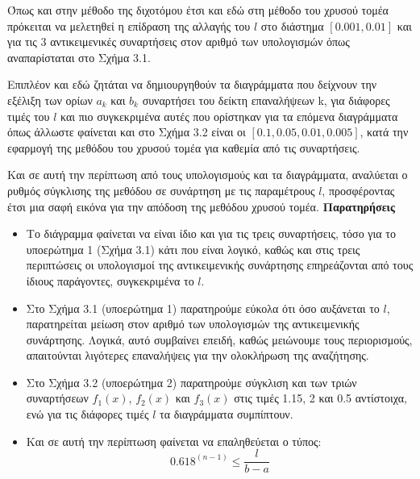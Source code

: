 \documentclass[a4paper,12pt]{report}
\newcommand{\en}{\selectlanguage{english}}
\newcommand{\gr}{\selectlanguage{greek}}
\begin{document}
\vspace{0.3cm}

\hspace{-0.6cm}Όπως και στην μέθοδο της διχοτόμου έτσι και εδώ στη μέθοδο του χρυσού τομέα πρόκειται να μελετηθεί η επίδραση της αλλαγής του \(l\) στο διάστημα  \([0.001, 0.01]\) και για τις 3 αντικειμενικές συναρτήσεις στον αριθμό των υπολογισμών όπως αναπαρίσταται στο Σχήμα 3.1. 

\vspace{0.3cm}
\hspace{-0.6cm}Επιπλέον και εδώ ζητάται να δημιουργηθούν τα διαγράμματα που δείχνουν την εξέλιξη των ορίων \(a_k\) και \(b_k\) συναρτήσει του δείκτη επαναλήψεων \en k\gr, για διάφορες τιμές του \(l\) και πιο συγκεκριμένα αυτές που ορίστηκαν για τα επόμενα διαγράμματα όπως άλλωστε φαίνεται και στο Σχήμα 3.2 είναι οι \([0.1, 0.05, 0.01, 0.005]\), κατά την εφαρμογή της μεθόδου του χρυσού τομέα για καθεμία από τις συναρτήσεις.
\vspace{0.3cm}

\hspace{-0.6cm}Και σε αυτή την περίπτωση από τους υπολογισμούς και τα διαγράμματα, αναλύεται ο ρυθμός σύγκλισης της μεθόδου σε συνάρτηση με τις παραμέτρους \(l\), προσφέροντας έτσι μια σαφή εικόνα για την απόδοση της μεθόδου χρυσού τομέα.
\newpage
\vspace{0.8cm}
\hspace{-0.6cm}\textbf{Παρατηρήσεις}
\begin{itemize}
    \item Το διάγραμμα φαίνεται να είναι ίδιο και για τις τρεις συναρτήσεις, τόσο για το υποερώτημα 1 (Σχήμα 3.1) κάτι που είναι λογικό, καθώς και στις τρεις περιπτώσεις οι υπολογισμοί της αντικειμενικής συνάρτησης επηρεάζονται από τους ίδιους παράγοντες, συγκεκριμένα το \( l \).
    \item Στο Σχήμα 3.1 (υποερώτημα 1) παρατηρούμε εύκολα ότι όσο αυξάνεται το \( l \), παρατηρείται μείωση στον αριθμό των υπολογισμών της αντικειμενικής συνάρτησης. Λογικά, αυτό συμβαίνει επειδή, καθώς μειώνουμε τους περιορισμούς, απαιτούνται λιγότερες επαναλήψεις για την ολοκλήρωση της αναζήτησης.
    \item Στο Σχήμα 3.2 (υποερώτημα 2) παρατηρούμε σύγκλιση και των τριών συναρτήσεων \( f_1(x) \), \( f_2(x) \) και \( f_3(x) \) στις τιμές 1.15, 2 και 0.5 αντίστοιχα, ενώ για τις διάφορες τιμές \( l \) τα διαγράμματα συμπίπτουν.
    \item Και σε αυτή την περίπτωση φαίνεται να επαληθεύεται ο τύπος: \[
    0.618^{(n-1)} \leq \frac{l}{b - a}
    \]
\end{itemize}
\end{document}
